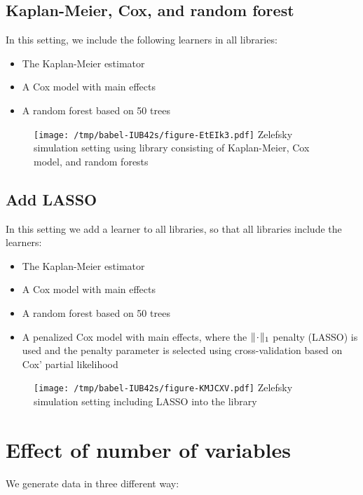 \documentclass[a4paper,danish]{article}
\begin{document}
\clearpage

\subsection{Kaplan-Meier, Cox, and random forest}
\label{sec:org3ebe586}
In this setting, we include the following learners in all libraries:

\begin{itemize}
\item The Kaplan-Meier estimator
\item A Cox model with main effects
\item A random forest based on 50 trees
\end{itemize}


\begin{figure}[htbp]
\centering
\texttt{[image: /tmp/babel-IUB42s/figure-EtEIk3.pdf]}
Zelefsky simulation setting using library consisting of Kaplan-Meier, Cox model, and random forests
\end{figure}

\clearpage

\subsection{Add LASSO}
\label{sec:org98a9507}
In this setting we add a learner to all libraries, so that all libraries include
the learners:

\begin{itemize}
\item The Kaplan-Meier estimator
\item A Cox model with main effects
\item A random forest based on 50 trees
\item A penalized Cox model with main effects, where the \(\|\blank\|_1\) penalty
(LASSO) is used and the penalty parameter is selected using cross-validation
based on Cox' partial likelihood
\end{itemize}

\begin{figure}[htbp]
\centering
\texttt{[image: /tmp/babel-IUB42s/figure-KMJCXV.pdf]}
Zelefsky simulation setting including LASSO into the library
\end{figure}

\clearpage


\section{Effect of number of variables}
\label{sec:org2e42afe}
We generate data in three different way:
\end{document}

